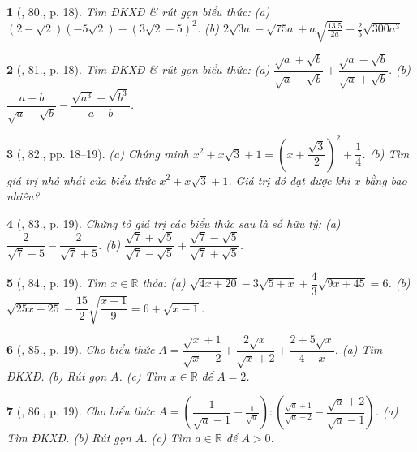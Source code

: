 \documentclass{article}
\newtheorem{baitoan}{}%
\begin{document}
\begin{baitoan}[\cite{SBT_Toan_9_tap_1}, 80., p. 18]
	Tìm ĐKXĐ \& rút gọn biểu thức: (a) $(2 - \sqrt{2})(-5\sqrt{2}) - (3\sqrt{2} - 5)^2$. (b) $2\sqrt{3a} - \sqrt{75a} + a\sqrt{\frac{13.5}{2a}} - \frac{2}{5}\sqrt{300a^3}$
\end{baitoan}

\begin{baitoan}[\cite{SBT_Toan_9_tap_1}, 81., p. 18]
	Tìm ĐKXĐ \& rút gọn biểu thức: (a) $\dfrac{\sqrt{a} + \sqrt{b}}{\sqrt{a} - \sqrt{b}} + \dfrac{\sqrt{a} - \sqrt{b}}{\sqrt{a} + \sqrt{b}}$. (b) $\dfrac{a - b}{\sqrt{a} - \sqrt{b}} - \dfrac{\sqrt{a^3} - \sqrt{b^3}}{a - b}$.
\end{baitoan}

\begin{baitoan}[\cite{SBT_Toan_9_tap_1}, 82., pp. 18--19]
	(a) Chứng minh $x^2 + x\sqrt{3} + 1 = \left(x + \dfrac{\sqrt{3}}{2}\right)^2 + \dfrac{1}{4}$. (b) Tìm giá trị nhỏ nhất của biểu thức $x^2 + x\sqrt{3} + 1$. Giá trị đó đạt được khi $x$ bằng bao nhiêu?
\end{baitoan}

\begin{baitoan}[\cite{SBT_Toan_9_tap_1}, 83., p. 19]
	Chứng tỏ giá trị các biểu thức sau là số hữu tỷ: (a) $\dfrac{2}{\sqrt{7} - 5} - \dfrac{2}{\sqrt{7} + 5}$. (b) $\dfrac{\sqrt{7} + \sqrt{5}}{\sqrt{7} - \sqrt{5}} + \dfrac{\sqrt{7} - \sqrt{5}}{\sqrt{7} + \sqrt{5}}$.
\end{baitoan}

\begin{baitoan}[\cite{SBT_Toan_9_tap_1}, 84., p. 19]
	Tìm $x\in\mathbb{R}$ thỏa: (a) $\sqrt{4x + 20} - 3\sqrt{5 + x} + \dfrac{4}{3}\sqrt{9x + 45} = 6$. (b) $\sqrt{25x - 25} - \dfrac{15}{2}\sqrt{\dfrac{x - 1}{9}} = 6 + \sqrt{x - 1}$.
\end{baitoan}

\begin{baitoan}[\cite{SBT_Toan_9_tap_1}, 85., p. 19]
	Cho biểu thức $A = \dfrac{\sqrt{x} + 1}{\sqrt{x} - 2} + \dfrac{2\sqrt{x}}{\sqrt{x} + 2} + \dfrac{2 + 5\sqrt{x}}{4 - x}$. (a) Tìm ĐKXĐ. (b) Rút gọn $A$. (c) Tìm $x\in\mathbb{R}$ để $A = 2$. 
\end{baitoan}

\begin{baitoan}[\cite{SBT_Toan_9_tap_1}, 86., p. 19]
	Cho biểu thức $A = \left(\dfrac{1}{\sqrt{a} - 1} - \frac{1}{\sqrt{a}}\right):\left(\frac{\sqrt{a} + 1}{\sqrt{a} - 2} - \dfrac{\sqrt{a} + 2}{\sqrt{a} - 1}\right)$. (a) Tìm ĐKXĐ. (b) Rút gọn $A$. (c) Tìm $a\in\mathbb{R}$ để $A > 0$.
\end{baitoan}
\end{document}
